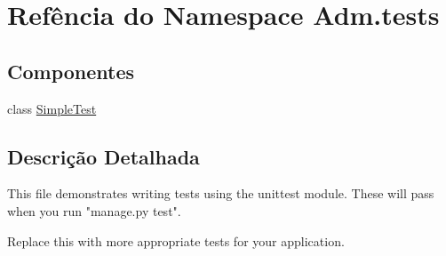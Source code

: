 \hypertarget{namespaceAdm_1_1tests}{\section{Refência do Namespace Adm.\-tests}
\label{dd/d46/namespaceAdm_1_1tests}
}
\subsection*{Componentes}
\begin{DoxyCompactItemize}
\item 
class \hyperlink{classAdm_1_1tests_1_1SimpleTest}{Simple\-Test}
\end{DoxyCompactItemize}


\subsection{Descrição Detalhada}
\begin{DoxyVerb}This file demonstrates writing tests using the unittest module. These will pass
when you run "manage.py test".

Replace this with more appropriate tests for your application.
\end{DoxyVerb}
 